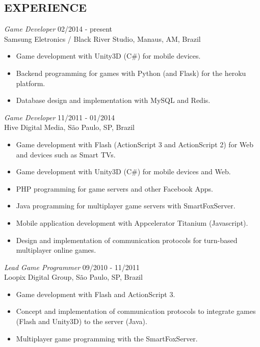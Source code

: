 \documentclass[line,margin]{res}
\begin{document}
\begin{resume}
\section{EXPERIENCE} {\sl Game Developer} \hfill 02/2014 - present \\
                Samsung Eletronics / Black River Studio, Manaus, AM, Brazil
                 \begin{itemize}  \itemsep 1pt
                 \item Game development with Unity3D (C\#) for mobile devices.
		 \item Backend programming for games with Python (and Flask) for the heroku platform.
                 \item Database design and implementation with MySQL and Redis.
                 \end{itemize}
                 
		{\sl Game Developer} \hfill 11/2011 - 01/2014 \\
                Hive Digital Media, São Paulo, SP, Brazil
                 \begin{itemize}  \itemsep 1pt
                 \item Game development with Flash (ActionScript 3 and ActionScript 2) for Web and devices such as Smart TVs.
		 \item Game development with Unity3D (C\#) for mobile devices and Web.
                 \item PHP programming for game servers and other Facebook Apps.
                 \item Java programming for multiplayer game servers with SmartFoxServer.
		 \item Mobile application development with Appcelerator Titanium (Javascript).
                 \item Design and implementation of communication protocols for turn-based multiplayer online games.
                 \end{itemize}
                 
                {\sl Lead Game Programmer} \hfill 09/2010 - 11/2011 \\
                Loopix Digital Group, São Paulo, SP, Brazil
                 \begin{itemize}  \itemsep 1pt
                 \item Game development with Flash and ActionScript 3.
                 \item Concept and implementation of communication protocols to integrate games (Flash and Unity3D) to the server (Java).
                 \item Multiplayer game programming with the SmartFoxServer.
                 \end{itemize}
 

\end{resume}
\end{document}
